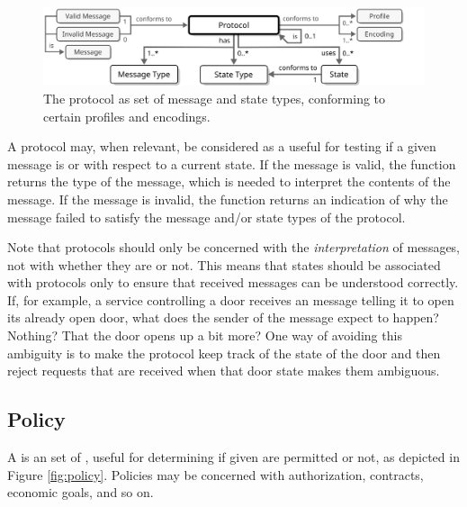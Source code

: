 \vfill

\begin{figure}[ht!]
  \centering
  \includegraphics[scale=0.9]{figures/protocol}
  \caption{
    The protocol as set of message and state types, conforming to certain profiles and encodings.
  }
  \label{fig:protocol}
\end{figure}

A protocol may, when relevant, be considered as a  useful for testing if a given message is  or  with respect to a current state.
If the message is valid, the function returns the type of the message, which is needed to interpret the contents of the message.
If the message is invalid, the function returns an indication of why the message failed to satisfy the message and/or state types of the protocol. 

Note that protocols should only be concerned with the \textit{interpretation} of messages, not with whether they are  or not.
This means that states should be associated with protocols only to ensure that received messages can be understood correctly.
If, for example, a service controlling a door receives an message telling it to open its already open door, what does the sender of the message expect to happen?
Nothing?
That the door opens up a bit more?
One way of avoiding this ambiguity is to make the protocol keep track of the state of the door and then reject requests that are received when that door state makes them ambiguous.

\subsection{Policy}
\label{sec:concepts:policy}

A  is an  set of , useful for determining if given  are permitted or not, as depicted in Figure \ref{fig:policy}.
Policies may be concerned with authorization, contracts, economic goals, and so on.

